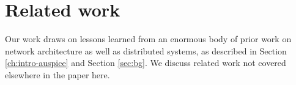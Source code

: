 %





\vspace{-0.1in}
\section{Related work}
\label{sec:related}


Our work draws on lessons learned from an enormous body of prior work on network architecture as well as distributed systems, as described in Section \ref{ch:intro-auspice} and Section \ref{sec:bg}. We discuss related work not covered elsewhere in the paper here.


